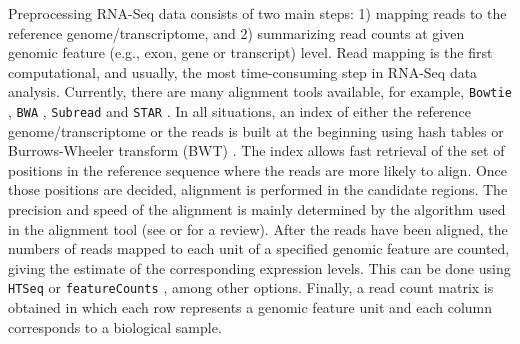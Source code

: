 Preprocessing RNA-Seq data consists of two main steps: 1) mapping reads to the reference
genome/transcriptome, and 2) summarizing read counts at given genomic feature (e.g., exon, gene or
transcript) level. Read mapping is the first computational, and usually, the most time-consuming
step in RNA-Seq data analysis. Currently, there are many alignment tools available, for example,
\verb|Bowtie| \citep{langmead2012fast,langmead2009ultrafast}, \verb|BWA| 
\citep{li2013aligning,li2009fast},
\verb|Subread| \citep{shi2013subread} and \verb|STAR| \citep{dobin2013star}. In all situations, an 
index of either
the reference genome/transcriptome or the reads is built at the beginning using hash tables or 
Burrows-Wheeler
transform (BWT) \citep{burrows1994block}. The index allows fast retrieval of the set of positions in
the reference sequence where the reads are more likely to align. Once those positions are decided,
alignment is performed in the candidate regions. The precision and speed of the alignment is mainly
determined by the algorithm used in the alignment tool (see \citep{hatem2013benchmarking} or
\cite{li2010survey} for a review). After the reads have been aligned, the numbers of reads mapped to
each unit of a specified genomic feature are counted, giving the estimate of the corresponding
expression levels. This can be done using \verb|HTSeq| \cite{anders2010htseq} or 
\verb|featureCounts| 
\citep{liao2013featurecounts}, among other options. Finally, a read count matrix is
obtained in which each row represents a genomic feature unit and each column corresponds to a 
biological
sample. 

